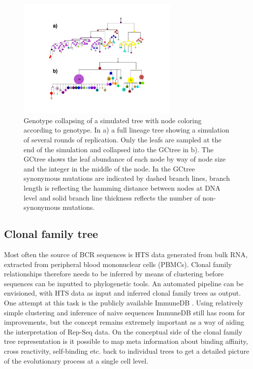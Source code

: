\begin{figure}[!ht]
    \centering
    \includegraphics[width=0.7\textwidth]{figures/collapsed_tree_example.pdf}
    \caption{
        \label{fig:collapsed_tree_example}
        Genotype collapsing of a simulated tree with node coloring according to genotype.
        In a) a full lineage tree showing a simulation of several rounds of replication.
        Only the leafs are sampled at the end of the simulation and collapsed into the GCtree in b).
        The GCtree shows the leaf abundance of each node by way of node size and the integer in the middle of the node.
        In the GCtree synonymous mutations are indicated by dashed branch lines, branch length is reflecting the hamming distance between nodes at DNA level and solid branch line thickness reflects the number of non-synonymous mutations.
    }
\end{figure}





\subsection{Clonal family tree}
Most often the source of BCR sequences is HTS data generated from bulk RNA, extracted from peripheral blood mononuclear cells (PBMCs).
Clonal family relationships therefore needs to be inferred by means of clustering before sequences can be inputted to phylogenetic tools.
An automated pipeline can be envisioned, with HTS data as input and inferred clonal family trees as output.
One attempt at this task is the publicly available ImmuneDB \cite{rosenfeld2017immunedb}.
Using relatively simple clustering and inference of naive sequences ImmuneDB still has room for improvements, but the concept remains extremely important as a way of aiding the interpretation of Rep-Seq data.
On the conceptual side of the clonal family tree representation is it possible to map meta information about binding affinity, cross reactivity, self-binding etc. back to individual trees to get a detailed picture of the evolutionary process at a single cell level.






